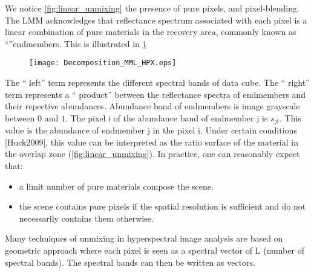 We notice \ref{fig:linear_unmixing} the
presence of pure pixels, and pixel-blending. The LMM acknowledges that
reflectance spectrum associated with each pixel is a linear combination of pure materials in the recovery area, commonly known as ``''endmembers. This is illustrated in \ref{fig:decomp_mml}

\begin{figure}[h]
  \centering
  \texttt{[image: Decomposition\_MML\_HPX.eps]}
  \label{fig:decomp_mml}
\end{figure}
The `` left'' term represents the different spectral bands of
data cube. The `` right'' term represents a `` product''
between the reflectance spectra of endmembers and their repective abundances. Abundance band of endmembers is
image grayscale between $0$ and $1$. The pixel i of the
abundance band of endmember j is $s_ {ji}$. This value is the
abundance of endmember j in the pixel i. Under certain conditions
[Huck2009], this value can be interpreted as the ratio
surface of the material in the overlap zone (\ref{fig:linear_unmixing}). In
practice, one can reasonably expect that: 

\begin{itemize}
\item{a limit number
of pure materials compose the scene.}
\item{the scene contains pure pixels if the spatial resolution is sufficient and
do not necessarily contains them otherwise.}
\end{itemize}

Many techniques of unmixing in hyperspectral image analysis
are based on geometric approach where each pixel is seen as a spectral
vector of L (number of spectral bands). The
spectral bands can then be written as vectors.

\begin{figure}[h]
\label{fig:mml}
\end{figure}

